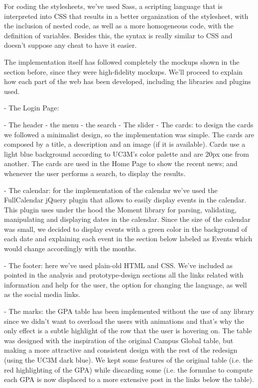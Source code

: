 \documentclass{article}
\begin{document}
For coding the stylesheets, we've used Sass, a scripting language that is interpreted into CSS that results in a better organization of the stylesheet, with the inclusion of nested code, as well as a more homogeneous code, with the definition of variables. Besides this, the syntax is really similar to CSS and doesn't suppose any cheat to have it easier.

The implementation itself has followed completely the mockups shown in the section before, since they were high-fidelity mockups. We'll proceed to explain how each part of the web has been developed, including the libraries and plugins used.

- The Login Page:

- The header
	- the menu 
	- the search
- The slider
- The cards: to design the cards we followed a minimalist design, so the implementation was
simple. The cards are composed by a title, a description and an image (if
it is available). Cards use a light blue background according to UC3M's color
palette and are 20px one from another. The cards are used in the Home Page to
show the recent news; and whenever the user performs a search, to display the 
results.


- The calendar: for the implementation of the calendar we've used the FullCalendar jQuery plugin that allows to easily display events in the calendar. This plugin uses under the hood the Moment library for parsing, validating, manipulating and displaying dates in the calendar. Since the size of the calendar was small, we decided to display events with a green color in the background of each date and explaining each event in the section below labeled as Events which would change accordingly with the months. 

- The footer: here we've used plain-old HTML and CSS. We've included as pointed in the analysis and prototype-design sections all the links related with information and help for the user, the option for changing the language, as well as the social media links.

- The marks: the GPA table has been implemented without the use of any library since we didn't want to
overload the users with animations and that's why the only effect is a subtle
highlight of the row that the user is hovering on. The table was designed with the
inspiration of the original Campus Global table, but making a more attractive and
consistent design with the rest of the redesign (using the UC3M dark blue). We
kept some features of the original table (i.e. the red highlighting of the GPA)
while discarding some (i.e. the formulae to compute each GPA is now displaced to
a more extensive post in the links below the table).








 
\end{document}
